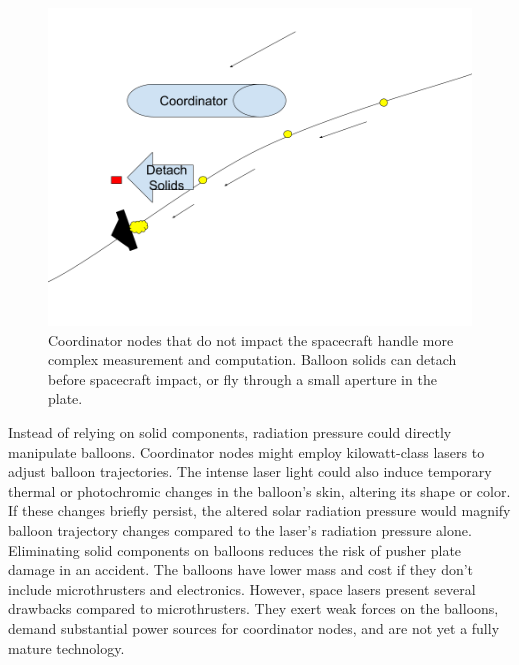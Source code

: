 \documentclass{article}
\begin{document}
\begin{figure}[htpb]
    \centering
    \includegraphics[width=0.5\linewidth]{images/Coordinator Nodes.png}
    \caption{Coordinator nodes that do not impact the spacecraft handle more complex measurement and computation.  Balloon solids can detach before spacecraft impact, or fly through a small aperture in the plate.}
    \label{fig:coordinator-nodes}
\end{figure}

Instead of relying on solid components, radiation pressure could directly manipulate balloons. Coordinator nodes might employ kilowatt-class lasers to adjust balloon trajectories. The intense laser light could also induce temporary thermal or photochromic changes in the balloon's skin, altering its shape or color. If these changes briefly persist, the altered solar radiation pressure would magnify balloon trajectory changes compared to the laser's radiation pressure alone. Eliminating solid components on balloons  reduces the risk of pusher plate damage in an accident.  The balloons have lower mass and cost if they don't include microthrusters and electronics. However, space lasers present several drawbacks compared to microthrusters. They exert weak forces on the balloons, demand substantial power sources for coordinator nodes, and are not yet a fully mature technology.  
\end{document}
